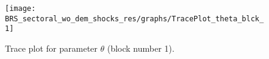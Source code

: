 \begin{figure}[H]
\centering
  \texttt{[image: BRS\_sectoral\_wo\_dem\_shocks\_res/graphs/TracePlot\_theta\_blck\_1]}\\
    \caption{Trace plot for parameter ${\theta}$ (block number 1).}
\end{figure}
